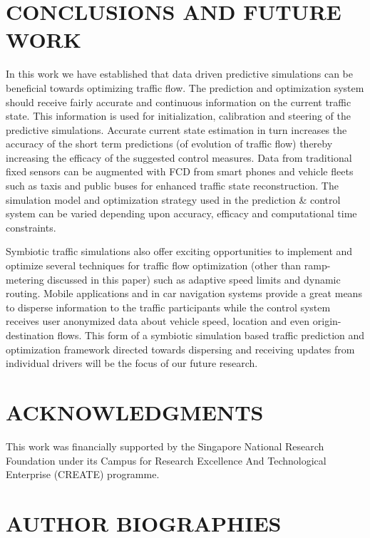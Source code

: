 \documentclass{wscpaperproc}
\theoremstyle{wsc}
\begin{document}
\section{CONCLUSIONS AND FUTURE WORK}
\label{sec:conclusion}
In this work we have established that data driven predictive simulations can be beneficial towards optimizing traffic flow.  The prediction and optimization system should receive fairly accurate and continuous information on the current traffic state. This information is used for initialization, calibration and steering of the predictive simulations. Accurate current state estimation in turn increases the accuracy of the short term predictions (of evolution of traffic flow) thereby increasing the efficacy of the suggested control measures. Data from traditional fixed sensors can be augmented with FCD from smart phones and vehicle fleets such as taxis and public buses for enhanced traffic state reconstruction. The simulation model and optimization strategy used in the prediction \& control system can be varied depending upon accuracy, efficacy and computational time constraints.

Symbiotic traffic simulations also offer exciting opportunities to implement and optimize several techniques for traffic flow optimization (other than ramp-metering discussed in this paper) such as adaptive speed limits and dynamic routing. Mobile applications and in car navigation systems provide a great means to disperse information to the traffic participants while the control system receives user anonymized data about vehicle speed, location and even origin-destination flows. This form of a symbiotic simulation based traffic prediction and optimization framework directed towards dispersing and receiving updates from individual drivers will be the focus of our future research.

\section*{ACKNOWLEDGMENTS}
This work was financially supported by the Singapore National Research Foundation under its Campus for Research Excellence And Technological Enterprise (CREATE) programme.
\appendix





\section*{AUTHOR BIOGRAPHIES}
\end{document}
